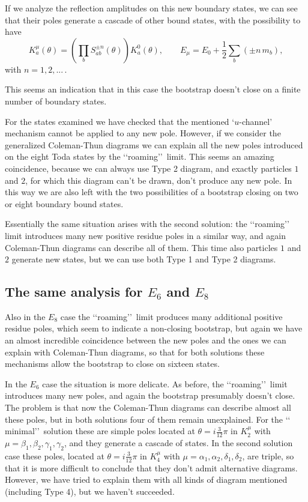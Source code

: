 \documentclass[a4paper,12pt]{report}
\begin{document}
If we analyze the reflection amplitudes on this new boundary states, we can see that their poles generate a
cascade of other bound states, with the possibility to have
\begin{equation}\label{noncolour}
K_{a}^{\mu}\left(\theta\right)=\left(\prod_{b}S_{ab}^{\pm
n}\left(\theta\right)\right)K_{a}^{0}\left(\theta\right), \qquad E_{\mu}=E_{0}+\frac{1}{2}\sum_{b}\left(\pm
n\,m_{b}\right),
\end{equation}
with $n=1,2,...$\,.

This seems an indication that in this case the bootstrap doesn't close on a finite number of boundary states.

For the states examined we have checked that the mentioned \lq$u$-channel\rq \, mechanism cannot be applied to any
new pole. However, if we consider the generalized Coleman-Thun diagrams we can explain all the new poles
introduced on the eight Toda states by the \lq\lq roaming\rq\rq \, limit. This seems an amazing coincidence,
because we can always use Type 2 diagram, and exactly particles $1$ and $2$, for which this diagram can't be
drawn, don't produce any new pole. In this way we are also left with the two possibilities of a bootstrap closing
on two or eight boundary bound states.

Essentially the same situation arises with the second solution: the \lq\lq roaming\rq\rq \, limit introduces many
new positive residue poles in a similar way, and again Coleman-Thun diagrams can describe all of them. This time
also particles $1$ and $2$ generate new states, but we can use both Type 1 and Type 2 diagrams.

\subsection{The same analysis for $E_{6}$ and $E_{8}$}

Also in the $E_{8}$ case the \lq\lq roaming\rq\rq \, limit produces many additional positive residue poles, which
seem to indicate a non-closing bootstrap, but again we have an almost incredible coincidence between the new
poles and the ones we can explain with Coleman-Thun diagrams, so that for both solutions these mechanisms allow
the bootstrap to close on sixteen states.

\vspace{0.5cm}

In the $E_{6}$ case the situation is more delicate. As before, the \lq\lq roaming\rq\rq \, limit introduces many
new poles, and again the bootstrap presumably doesn't close. The problem is that now the Coleman-Thun diagrams
can describe almost all these poles, but in both solutions four of them remain unexplained. For the \lq\lq
minimal\rq\rq \, solution these are simple poles located at $\theta=i\frac{3}{12}\pi$ in $K_{2}^{\mu}$ with
$\mu=\beta_{1},\beta_{2},\gamma_{1},\gamma_{2}$, and they generate a cascade of states. In the second solution
case these poles, located at $\theta=i\frac{3}{12}\pi$ in $K_{4}^{\mu}$ with
$\mu=\alpha_{1},\alpha_{2},\delta_{1},\delta_{2}$, are triple, so that it is more difficult to conclude that they
don't admit alternative diagrams. However, we have tried to explain them with all kinds of diagram mentioned
(including Type 4), but we haven't succeeded.
\end{document}
